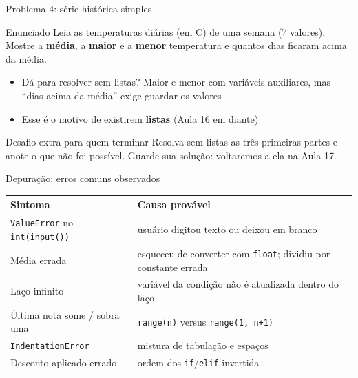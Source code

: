 \documentclass[aspectratio=169,10pt,t]{beamer}
\begin{document}
\begin{frame}{Problema 4: série histórica simples}
  \begin{exampleblock}{Enunciado}
    Leia as temperaturas diárias (em \textdegree C) de uma semana (7 valores). Mostre a \textbf{média}, a \textbf{maior} e a \textbf{menor} temperatura e quantos dias ficaram acima da média.
  \end{exampleblock}
  \begin{itemize}
    \item Dá para resolver \alert{sem listas}? Maior e menor com variáveis auxiliares, mas ``dias acima da média'' exige guardar os valores
    \item Esse é o motivo de existirem \textbf{listas} (Aula 16 em diante)
  \end{itemize}
  \begin{block}{Desafio extra para quem terminar}
    Resolva sem listas as três primeiras partes e anote o que não foi possível. Guarde sua solução: voltaremos a ela na Aula 17.
  \end{block}
\end{frame}

\begin{frame}{Depuração: erros comuns observados}
  \centering\small
  \begin{tabular}{p{4.2cm}p{7.2cm}}
    \toprule
    Sintoma & Causa provável\\
    \midrule
    \texttt{ValueError} no \texttt{int(input())} & usuário digitou texto ou deixou em branco\\
    Média errada & esqueceu de converter com \texttt{float}; dividiu por constante errada\\
    Laço infinito & variável da condição não é atualizada dentro do laço\\
    Última nota some / sobra uma & \texttt{range(n)} versus \texttt{range(1, n+1)}\\
    \texttt{IndentationError} & mistura de tabulação e espaços\\
    Desconto aplicado errado & ordem dos \texttt{if}/\texttt{elif} invertida\\
    \bottomrule
  \end{tabular}
\end{frame}


\end{document}
